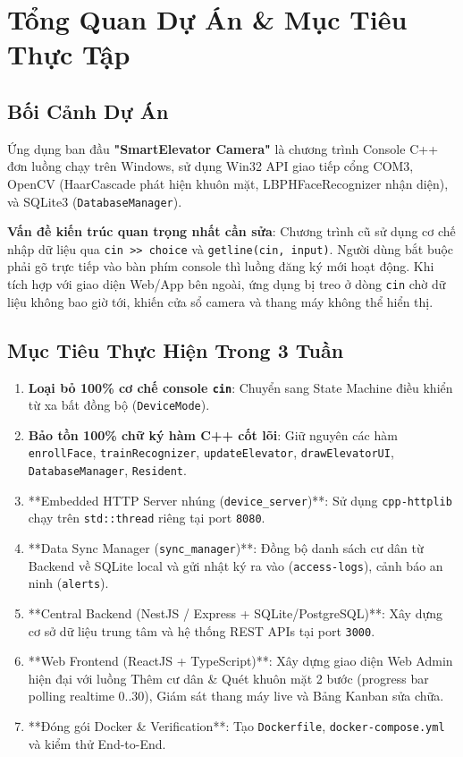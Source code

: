 \documentclass[12pt,a4paper]{article}
\begin{document}
\section{Tổng Quan Dự Án \& Mục Tiêu Thực Tập}

\subsection{Bối Cảnh Dự Án}
Ứng dụng ban đầu \textbf{"SmartElevator Camera"} là chương trình Console C++ đơn luồng chạy trên Windows, sử dụng Win32 API giao tiếp cổng COM3, OpenCV (HaarCascade phát hiện khuôn mặt, LBPHFaceRecognizer nhận diện), và SQLite3 (\texttt{DatabaseManager}). 

\textbf{Vấn đề kiến trúc quan trọng nhất cần sửa}: Chương trình cũ sử dụng cơ chế nhập dữ liệu qua \texttt{cin >> choice} và \texttt{getline(cin, input)}. Người dùng bắt buộc phải gõ trực tiếp vào bàn phím console thì luồng đăng ký mới hoạt động. Khi tích hợp với giao diện Web/App bên ngoài, ứng dụng bị treo ở dòng \texttt{cin} chờ dữ liệu không bao giờ tới, khiến cửa sổ camera và thang máy không thể hiển thị.

\subsection{Mục Tiêu Thực Hiện Trong 3 Tuần}
\begin{enumerate}
    \item \textbf{Loại bỏ 100\% cơ chế console \texttt{cin}}: Chuyển sang State Machine điều khiển từ xa bất đồng bộ (\texttt{DeviceMode}).
    \item \textbf{Bảo tồn 100\% chữ ký hàm C++ cốt lõi}: Giữ nguyên các hàm \texttt{enrollFace}, \texttt{trainRecognizer}, \texttt{updateElevator}, \texttt{drawElevatorUI}, \texttt{DatabaseManager}, \texttt{Resident}.
    \item **Embedded HTTP Server nhúng (\texttt{device\_server})**: Sử dụng \texttt{cpp-httplib} chạy trên \texttt{std::thread} riêng tại port \texttt{8080}.
    \item **Data Sync Manager (\texttt{sync\_manager})**: Đồng bộ danh sách cư dân từ Backend về SQLite local và gửi nhật ký ra vào (\texttt{access-logs}), cảnh báo an ninh (\texttt{alerts}).
    \item **Central Backend (NestJS / Express + SQLite/PostgreSQL)**: Xây dựng cơ sở dữ liệu trung tâm và hệ thống REST APIs tại port \texttt{3000}.
    \item **Web Frontend (ReactJS + TypeScript)**: Xây dựng giao diện Web Admin hiện đại với luồng Thêm cư dân \& Quét khuôn mặt 2 bước (progress bar polling realtime 0..30), Giám sát thang máy live và Bảng Kanban sửa chữa.
    \item **Đóng gói Docker \& Verification**: Tạo \texttt{Dockerfile}, \texttt{docker-compose.yml} và kiểm thử End-to-End.
\end{enumerate}
\end{document}
